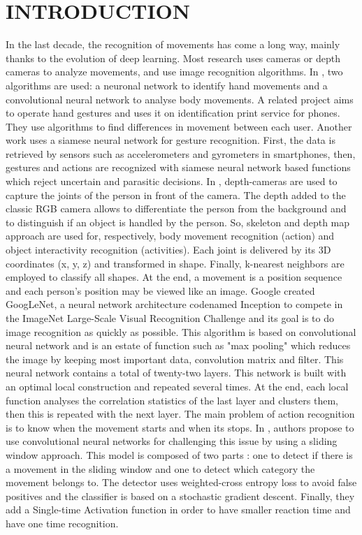 \documentclass[letterpaper, 10 pt, conference]{ieeeconf}  %
\begin{document}
\section{INTRODUCTION}
In the last decade, the recognition of movements has come a long way, mainly thanks to the evolution of deep learning. Most research uses cameras or depth cameras to analyze movements, and use image recognition algorithms. In \cite{nev16}, two algorithms are used: a neuronal network to identify hand movements and a convolutional neural network to analyse body movements. A related project aims to operate hand gestures and uses it on identification print service for phones. They use algorithms to find differences in movement between each user. Another work \cite{ber15} uses a siamese neural network for gesture recognition. First, the data is retrieved by sensors such as accelerometers and gyrometers in smartphones, then, gestures and actions are recognized with siamese neural network based functions which reject uncertain and parasitic decisions. In \cite{dev14}, depth-cameras are used to capture the joints of the person in front of the camera. The depth added to the classic RGB camera allows to differentiate the person from the background and to distinguish if an object is handled by the person. So, skeleton and depth map approach are used for, respectively, body movement recognition (action) and object interactivity recognition (activities). Each joint is delivered by its 3D coordinates (x, y, z) and transformed in shape. Finally, k-nearest neighbors are employed to classify all shapes. At the end, a movement is a position sequence and each person's position may be viewed like an image. Google created GoogLeNet, a neural network architecture codenamed Inception \cite{sze14} to compete in the ImageNet Large-Scale Visual Recognition Challenge and its goal is to do image recognition as quickly as possible. This algorithm is based on convolutional neural network and is an estate of function such as "max pooling" which reduces the image by keeping most important data, convolution matrix and filter. This neural network contains a total of twenty-two layers. This network is built with an optimal local construction and repeated several times. At the end, each local function analyses the correlation statistics of the last layer and clusters them, then this is repeated with the next layer. The main problem of action recognition is to know when the movement starts and when its stops. In \cite{kop19}, authors propose to use convolutional neural networks for challenging this issue by using a sliding window approach. This model is composed of two parts : one to detect if there is a movement in the sliding window and one to detect which category the movement belongs to. The detector uses weighted-cross entropy loss to avoid false positives and the classifier is based on a stochastic gradient descent. Finally, they add a Single-time Activation function in order to have smaller reaction time and have one time recognition.\\
\end{document}
